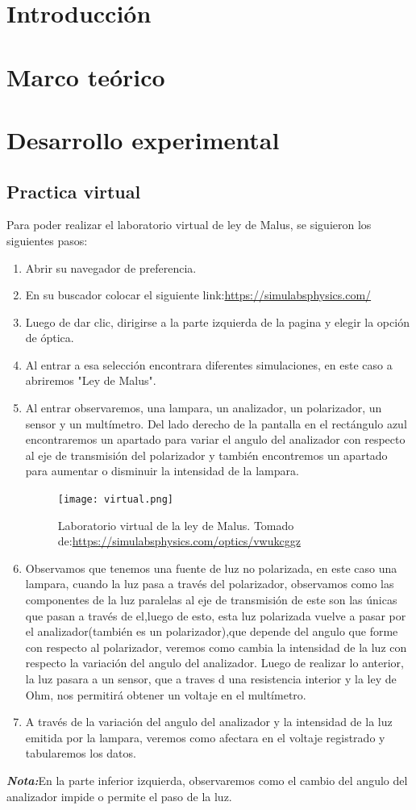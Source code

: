\documentclass{article}
\begin{document}
\begin{multicols}{2}

	\section*{Introducción}
	\section*{Marco teórico}
	\section*{Desarrollo experimental}
	\subsection*{Practica virtual}
	Para poder realizar el laboratorio virtual de ley de Malus, se siguieron los siguientes pasos:
	\begin{enumerate}
	\item Abrir su navegador de preferencia.
	\item En su  buscador colocar el siguiente link:\url{https://simulabsphysics.com/}
	\item Luego de dar clic, dirigirse a la parte izquierda de la pagina y elegir la opción de óptica.
	\item Al entrar a esa selección encontrara diferentes simulaciones, en este caso a abriremos "Ley de Malus".
	\item Al entrar observaremos, una lampara, un analizador, un polarizador, un sensor y un multímetro. Del lado derecho de la pantalla en el rectángulo azul encontraremos un apartado para variar el angulo del analizador con respecto al eje de transmisión del polarizador y también encontremos un apartado para aumentar o disminuir la intensidad de la lampara.
	\begin{figure}[H]
	\centering
	\texttt{[image: virtual.png]}
	\caption{Laboratorio virtual de la ley de Malus. Tomado de:\url{https://simulabsphysics.com/optics/vwukcggz}}
	\label{fig:enter-label}
	\end{figure}
	\item Observamos que tenemos una fuente de luz no polarizada, en este caso una lampara, cuando la luz pasa a través del polarizador, observamos como las componentes de la luz paralelas al eje de transmisión de este son las únicas que pasan a través de el,luego de esto, esta luz polarizada vuelve a pasar por el analizador(también es un polarizador),que depende del angulo que forme con respecto al polarizador, veremos como cambia la intensidad de la luz con respecto la variación del angulo del analizador. Luego de realizar lo anterior, la luz pasara a un sensor, que a traves d una resistencia interior y la ley de Ohm, nos permitirá obtener un voltaje en el multímetro.
	\item A través de la variación del angulo del analizador y la intensidad de la luz emitida por la lampara, veremos como afectara en el voltaje registrado y tabularemos los datos.
	\end{enumerate}
	\textit{\textbf{Nota:}}En la parte inferior izquierda, observaremos como el cambio del angulo del analizador impide o permite el paso de la luz.

\end{multicols}
\end{document}
